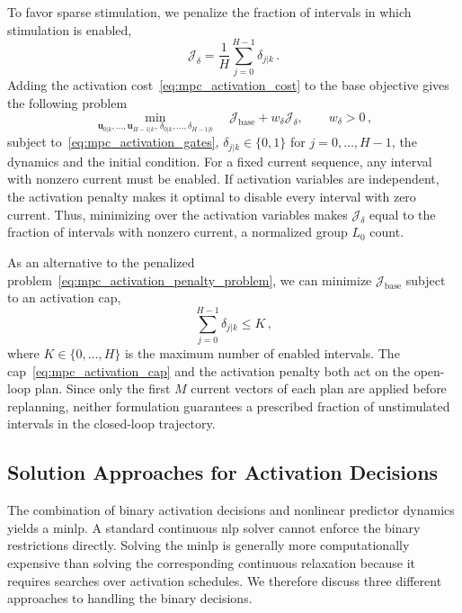 To favor sparse stimulation, we penalize the fraction of intervals in which stimulation is enabled,
%
\begin{equation}
    \mathcal J_{\delta}
    =\frac{1}{H}\sum_{j=0}^{H-1}\delta_{j|k}\,.
    \label{eq:mpc_activation_cost}
\end{equation}
%
Adding the activation cost~\eqref{eq:mpc_activation_cost} to the base objective gives the following problem
%
\begin{equation}
    \min_{\mathbf u_{0|k},\ldots,\mathbf u_{H-1|k},\,
          \delta_{0|k},\ldots,\delta_{H-1|k}}
    \quad \mathcal J_{\mathrm{base}}+w_{\delta}\mathcal J_{\delta},
    \qquad w_{\delta}>0\,,
    \label{eq:mpc_activation_penalty_problem}
\end{equation}
%
subject to~\eqref{eq:mpc_activation_gates}, $\delta_{j|k}\in\{0,1\}$ for $j=0,\ldots,H-1$, the dynamics and the initial condition.
For a fixed current sequence, any interval with nonzero current must be enabled.
If activation variables are independent, the activation penalty makes it optimal to disable every interval with zero current.
Thus, minimizing over the activation variables makes $\mathcal J_{\delta}$ equal to the fraction of intervals with nonzero current, a normalized group $L_0$ count.

As an alternative to the penalized problem~\eqref{eq:mpc_activation_penalty_problem}, we can minimize $\mathcal J_{\mathrm{base}}$ subject to an activation cap,
%
\begin{equation}
    \sum_{j=0}^{H-1}\delta_{j|k}\leq K\,,
    \label{eq:mpc_activation_cap}
\end{equation}
%
where $K\in\{0,\ldots,H\}$ is the maximum number of enabled intervals.
The cap~\eqref{eq:mpc_activation_cap} and the activation penalty both act on the open-loop plan.
Since only the first $M$ current vectors of each plan are applied before replanning, neither formulation guarantees a prescribed fraction of unstimulated intervals in the closed-loop trajectory.

\subsection{Solution Approaches for Activation Decisions}

The combination of binary activation decisions and nonlinear predictor dynamics yields a \ac{minlp}.
A standard continuous \ac{nlp} solver cannot enforce the binary restrictions directly.
Solving the \ac{minlp} is generally more computationally expensive than solving the corresponding continuous relaxation because it requires searches over activation schedules.
We therefore discuss three different approaches to handling the binary decisions.

